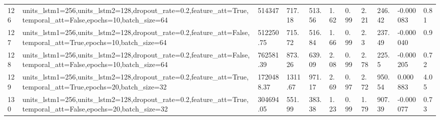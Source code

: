 \begin{longtable}{C{0.8cm} L{2cm} C{1.15cm} C{1.15cm} C{1.15cm} C{1.15cm} C{0.85cm} C{1.25cm} C{1.2cm} C{1.5cm} C{1.0cm}}
126 & units\_lstm1=256,\newline units\_lstm2=128,\newline dropout\_rate=0.2,\newline feature\_att=True,\newline temporal\_att=False,\newline epochs=10,\newline batch\_size=64 & 514347 & 717.18 & 513.56 & 1.62 & 0.99 & 2.21 & 246.42 & -0.000083 & 0.81 \\
127 & units\_lstm1=256,\newline units\_lstm2=128,\newline dropout\_rate=0.2,\newline feature\_att=False,\newline temporal\_att=True,\newline epochs=10,\newline batch\_size=64 & 512250.75 & 715.72 & 516.84 & 1.66 & 0.99 & 2.3 & 237.49 & -0.000040 & 0.9 \\
128 & units\_lstm1=256,\newline units\_lstm2=128,\newline dropout\_rate=0.2,\newline feature\_att=False,\newline temporal\_att=False,\newline epochs=10,\newline batch\_size=64 & 762581.39 & 873.26 & 639.09 & 2.08 & 0.99 & 2.78 & 225.5 & -0.000205 & 0.72 \\
129 & units\_lstm1=256,\newline units\_lstm2=128,\newline dropout\_rate=0.2,\newline feature\_att=True,\newline temporal\_att=True,\newline epochs=20,\newline batch\_size=32 & 1720488.37 & 1311.67 & 971.17 & 2.69 & 0.97 & 2.72 & 950.54 & 0.000883 & 4.05 \\
130 & units\_lstm1=256,\newline units\_lstm2=128,\newline dropout\_rate=0.2,\newline feature\_att=True,\newline temporal\_att=False,\newline epochs=20,\newline batch\_size=32 & 304694.05 & 551.99 & 383.38 & 1.23 & 0.99 & 1.79 & 907.39 & -0.000077 & 0.73 \\

\end{longtable}
